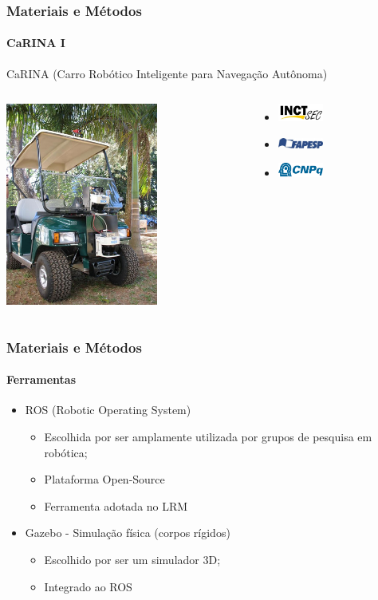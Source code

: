 \documentclass[brazil]{beamer}
\begin{document}
\begin{frame}
\frametitle{Materiais e Métodos}
\framesubtitle{CaRINA I}
 CaRINA (Carro Robótico Inteligente para Navegação Autônoma)
\begin{columns}[c]
\begin{column}{5cm}
\includegraphics[width=5cm,keepaspectratio]{../img/carina1_1.jpg}
\end{column}
\begin{column}{5cm}
\begin{itemize}
\item \includegraphics[width=1.5cm,keepaspectratio]{../img/inct.jpg}
\item \includegraphics[width=1.5cm,keepaspectratio]{../img/fapesp.jpg}
\item \includegraphics[width=1.5cm,keepaspectratio]{../img/cnpq.png}
\end{itemize}
\end{column}
\end{columns}
\end{frame}

\begin{frame}
\frametitle{Materiais e Métodos}
\framesubtitle{Ferramentas}
\begin{itemize}
\item ROS (Robotic Operating System)
\begin{itemize}
  \item Escolhida por ser amplamente utilizada por grupos de pesquisa em
  robótica;
  \item Plataforma Open-Source
  \item Ferramenta adotada no LRM
\end{itemize}
\item Gazebo - Simulação física (corpos rígidos)
\begin{itemize}
  \item Escolhido por ser um simulador 3D;
  \item Integrado ao ROS
\end{itemize}
\end{itemize}
\end{frame}
\end{document}
